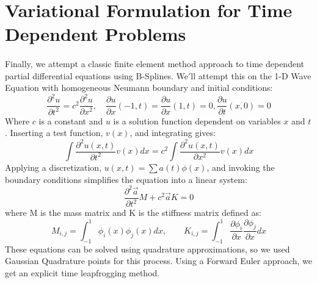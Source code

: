 \documentclass{article}
\begin{document}
\section*{Variational Formulation for Time Dependent Problems}
\paragraph{}
Finally, we attempt a classic finite element method approach to time dependent partial differential equations using B-Splines. We$'$ll attempt this on the 1-D Wave Equation with homogeneous Neumann boundary and initial conditions: 
\begin{equation*}
\frac{\partial ^2 u}{\partial t^2} = c^2\frac{\partial ^2 u}{\partial x^2},\quad \frac{\partial u}{\partial x}(-1,t)=\frac{\partial u}{\partial x}(1,t)=0, \frac{\partial u}{\partial t}(x,0)=0
\end{equation*}
Where $c$ is a constant and $u$ is a solution function dependent on variables $x$ and $t$. Inserting a test function, $v(x)$, and integrating gives: 
\begin{equation*}
\int \frac{\partial ^2 u(x,t)}{\partial t^2}v(x)dx = c^2\int \frac{\partial ^2 u(x,t)}{\partial x^2}v(x)dx
\end{equation*}
Applying a discretization, $u(x,t) = \sum a(t)\phi(x)$, and invoking the boundary conditions simplifies the equation into a linear system:
\begin{equation*}
\frac{\partial ^2\vec{a}}{\partial t^2}M + c^2\vec{a}K=0
\end{equation*}
where M is the mass matrix and K is the stiffness matrix defined as:
\begin{equation*}
M_{i,j}=\int ^1_{-1}\phi _i(x)\phi _j(x)dx,\qquad K_{i,j}=\int ^1_{-1}\frac{\partial \phi _i}{\partial x}\frac{\partial \phi _j}{\partial x}dx
\end{equation*}
These equations can be solved using quadrature approximations, so we used Gaussian Quadrature points for this process. Using a Forward Euler approach, we get an explicit time leapfrogging method.
\end{document}
